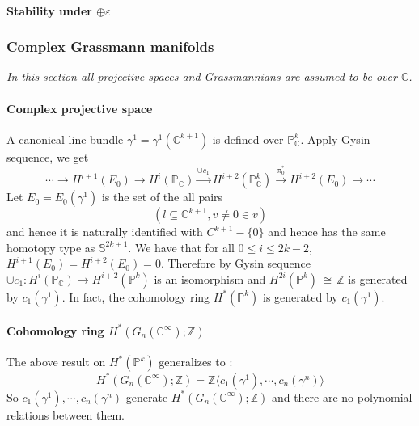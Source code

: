 \documentclass[12pt]{article}
\theoremstyle{plain}
\theoremstyle{definition}
\newcommand{\IC}{\mathbb{C}}
\newcommand{\IP}{\mathbb{P}}
\newcommand{\IS}{\mathbb{S}}
\newcommand{\IZ}{\mathbb{Z}}
\newcommand\iso{\,{\cong}\,}
\newcommand{\<}{\langle}
\renewcommand{\>}{\rangle}
\newcommand{\sm}{\varepsilon}
\begin{document}
\paragraph{Stability under $\oplus \sm$}

\subsubsection{Complex Grassmann manifolds} \textit{In this section all projective spaces and Grassmannians are assumed to be over $\IC$.}
\paragraph{Complex projective space} A canonical line bundle $\gamma^1 = \gamma^1(\IC^{k + 1})$ is defined over $\IP_\IC^k$. Apply Gysin sequence, we get 
$$ \cdots \longrightarrow H^{i+1}(E_0) \longrightarrow H^i(\IP_\IC) \stackrel{\cup c_1}{\longrightarrow} H^{i+2}(\IP_\IC^k) \stackrel{\pi_0^*}{\longrightarrow} H^{i + 2}(E_0) \longrightarrow \cdots $$
Let $E_0 = E_0(\gamma^1)$ is the set of the all pairs
$$ ( l \subseteq \IC^{k + 1}, v \neq 0 \in v)$$  and hence it is naturally identified with $C^{k + 1} - \{0\}$ and hence has the same homotopy type as $\IS^{2k+1}$. We have that for all $0 \le i \le 2k - 2$, $H^{i+1}(E_0) = H^{i+2}(E_0) = 0$. Therefore by Gysin sequence $\cup c_1 : H^i(\IP_\IC) \to H^{i+2}(\IP^k)$ is an isomorphism and $H^{2i}(\IP^k) \iso \IZ$ is generated by $c_1(\gamma^1)$. In fact, the cohomology ring $H^*(\IP^k)$ is generated by $c_1(\gamma^1)$. 

\paragraph{Cohomology ring $H^*(G_n(\IC^\infty); \IZ)$}
The above result on $H^*(\IP^k)$ generalizes to :
$$H^*(G_n(\IC^\infty); \IZ) = \IZ \< c_1(\gamma^1), \cdots, c_n(\gamma^n) \>$$
So $c_1(\gamma^1), \cdots, c_n(\gamma^n)$ generate $H^*(G_n(\IC^\infty); \IZ)$ and there are no polynomial relations between them. 
\end{document}
